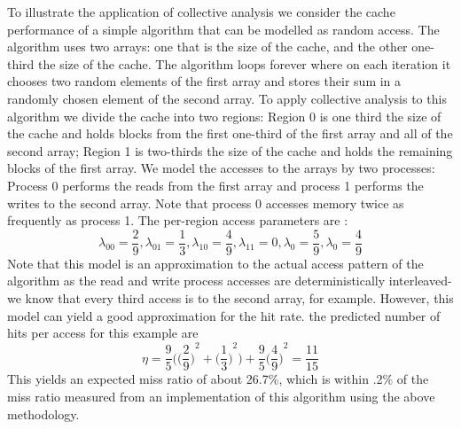 \documentclass[14pt]{article}
\begin{document}
To illustrate the application of collective analysis we consider the cache performance of a simple algorithm that can be modelled as random access. The algorithm uses two arrays: one that is the size of the cache, and the other one-third the size of the cache. The algorithm loops forever where on each iteration it chooses two random elements of the first array and stores their sum in a randomly chosen element of the second array. To apply collective analysis to this algorithm we divide the cache into two regions: Region 0 is one third the size of the cache and holds blocks from the first one-third of the first array and all of the second array; Region 1 is two-thirds the size of the cache and holds the remaining blocks of the first array. We model the accesses to the arrays by two processes: Process 0 performs the reads from the first array and process 1 performs the writes to the second array. Note that process 0 accesses memory twice as frequently as process 1. The per-region access parameters are :
$$ \lambda_{00} = {\dfrac{2}{9}} , \lambda_{01} = {\dfrac{1}{3}} ,  \lambda_{10} = {\dfrac{4}{9}} ,  \lambda_{11} = {0} , \lambda_{0} = {\dfrac{5}{9}} , \lambda_{0} = {\dfrac{4}{9}}$$
Note that this model is an approximation to the actual access pattern of the algorithm as the read and write process accesses are deterministically interleaved- we know that every third access is to the second array, for example. However, this model can yield a good approximation for the hit rate.
the predicted number of hits per access for this example are
$$\eta = {\dfrac{9}{5}}{\Bigg(\bigg(\dfrac{2}{9}\bigg)}^2 + {\bigg(\dfrac{1}{3}\bigg)}^2\Bigg) + {\dfrac{9}{5}}{\bigg(\dfrac{4}{9}\bigg)}^2 = {\dfrac{11}{15}}$$
This yields an expected miss ratio of about 26.7\%, which is within .2\% of the miss ratio measured from an implementation of this algorithm using the above methodology.
\end{document}
